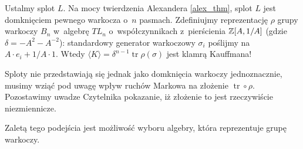 Ustalmy splot $L$.
Na mocy twierdzenia Alexandera \ref{alex_thm}, splot $L$ jest domknięciem pewnego warkocza o~$n$ pasmach.
Zdefiniujmy reprezentację $\rho$ grupy warkoczy $B_n$ w~algebrę $TL_n$ o~współczynnikach z~pierścienia $\mathbb Z[A, 1/A]$ (gdzie $\delta = -A^2 - A^{-2}$): standardowy generator warkoczowy $\sigma_i$ poślijmy na $A \cdot e_i + 1/A \cdot 1$.
Wtedy $\langle K \rangle = \delta^{n-1} \operatorname{tr} \rho (\sigma)$ jest klamrą Kauffmana!

Sploty nie przedstawiają się jednak jako domknięcia warkoczy jednoznacznie, musimy wziąć pod uwagę wpływ ruchów Markowa na złożenie $\operatorname{tr} \circ \rho$.
Pozostawimy uwadze Czytelnika pokazanie, iż złożenie to jest rzeczywiście niezmiennicze.

Zaletą tego podejścia jest możliwość wyboru algebry, która reprezentuje grupę warkoczy.
